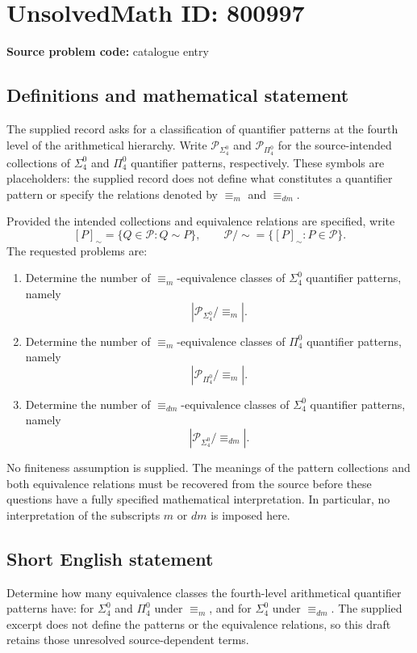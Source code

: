 \documentclass[11pt]{article}
\begin{document}
\section*{UnsolvedMath ID: 800997}
\textbf{Source problem code:} catalogue entry
\subsection{Definitions and mathematical statement}
The supplied record asks for a classification of quantifier patterns at the fourth level of the arithmetical hierarchy. Write \(\mathcal P_{\Sigma^0_4}\) and \(\mathcal P_{\Pi^0_4}\) for the source-intended collections of \(\Sigma^0_4\) and \(\Pi^0_4\) quantifier patterns, respectively. These symbols are placeholders: the supplied record does not define what constitutes a quantifier pattern or specify the relations denoted by \(\equiv_m\) and \(\equiv_{dm}\).

Provided the intended collections and equivalence relations are specified, write
\[
[P]_{\sim}=\{Q\in\mathcal P:Q\sim P\},\qquad
\mathcal P/{\sim}=\{[P]_{\sim}:P\in\mathcal P\}.
\]
The requested problems are:
\begin{enumerate}
\item Determine the number of \(\equiv_m\)-equivalence classes of \(\Sigma^0_4\) quantifier patterns, namely
\[
\left|\mathcal P_{\Sigma^0_4}/{\equiv_m}\right|.
\]
\item Determine the number of \(\equiv_m\)-equivalence classes of \(\Pi^0_4\) quantifier patterns, namely
\[
\left|\mathcal P_{\Pi^0_4}/{\equiv_m}\right|.
\]
\item Determine the number of \(\equiv_{dm}\)-equivalence classes of \(\Sigma^0_4\) quantifier patterns, namely
\[
\left|\mathcal P_{\Sigma^0_4}/{\equiv_{dm}}\right|.
\]
\end{enumerate}
No finiteness assumption is supplied. The meanings of the pattern collections and both equivalence relations must be recovered from the source before these questions have a fully specified mathematical interpretation. In particular, no interpretation of the subscripts \(m\) or \(dm\) is imposed here.
\subsection{Short English statement}
Determine how many equivalence classes the fourth-level arithmetical quantifier patterns have: for \(\Sigma^0_4\) and \(\Pi^0_4\) under \(\equiv_m\), and for \(\Sigma^0_4\) under \(\equiv_{dm}\). The supplied excerpt does not define the patterns or the equivalence relations, so this draft retains those unresolved source-dependent terms.
\end{document}

